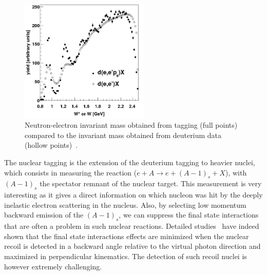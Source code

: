 \begin{figure}[htbp!]
\includegraphics[width=6.1cm]{plots/Wstar.png}
\caption{Neutron-electron invariant mass obtained from tagging (full points) compared 
to the invariant mass obtained
from deuterium data (hollow points)~\cite{Baillie:2011za}.}
\label{fig:wstar}
\end{figure}

The nuclear tagging is the extension of the deuterium tagging to heavier nuclei, which
consists in measuring the reaction ($e+A \rightarrow e+(A-1)_s+X$), with
$(A-1)_s$ the spectator remnant of the nuclear target. This measurement is very 
interesting as it gives a direct information on which nucleon was hit by the 
deeply inelastic electron scattering in the nucleus. Also, by selecting 
low momentum backward emission of the $(A-1)_s$, we can suppress the 
final state interactions that are often a problem in such nuclear reactions. 
Detailed studies~\cite{CiofidegliAtti:2003pb,Alvioli:2006jd} have indeed shown 
that the final state interactions effects are minimized when the nuclear recoil
is detected in a backward angle relative to 
the virtual photon direction and maximized in perpendicular kinematics.
The detection of such recoil nuclei is however extremely challenging.


